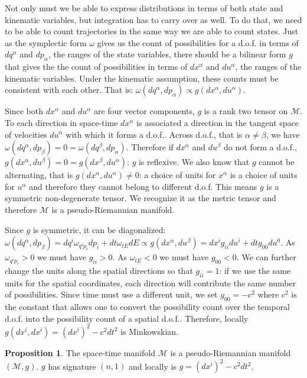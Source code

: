 \documentclass[smallextended]{svjour3}
\numberwithin{equation}{section}
\theoremstyle{definition}
\newtheorem{prop}[equation]{Proposition}
\begin{document}
Not only must we be able to express distributions in terms of both state and kinematic variables, but integration has to carry over as well. To do that, we need to be able to count trajectories in the same way we are able to count states. Just as the symplectic form $\omega$ gives us the count of possibilities for a d.o.f. in terms of $dq^\alpha$ and $dp_\alpha$, the ranges of the state variables, there should be a bilinear form $g$ that gives the the count of possibilities in terms of $dx^\alpha$ and $du^\alpha$, the ranges of the kinematic variables. Under the kinematic assumption, these counts must be consistent with each other. That is: $\omega(dq^\alpha,dp_\alpha) \propto g(dx^\alpha,du^\alpha)$.

Since both $dx^\alpha$ and $du^\alpha$ are four vector components, $g$ is a rank two tensor on $\mathcal{M}$. To each direction in space-time $dx^\alpha$ is associated a direction in the tangent space of velocities $du^\alpha$ with which it forms a d.o.f.. Across d.o.f., that is $\alpha \neq \beta$, we have $\omega(dq^\alpha, dp_\beta) = 0 =\omega(dq^\beta, dp_\alpha)$. Therefore if $dx^\alpha$ and $du^\beta$ do not form a d.o.f., $g(dx^\alpha, du^\beta) = 0 = g(dx^\beta, du^\alpha)$: $g$ is reflexive. We also know that $g$ cannot be alternating, that is $g(dx^\alpha, du^\alpha) \neq 0$: a choice of units for $x^\alpha$ is a choice of units for $u^\alpha$ and therefore they cannot belong to different d.o.f. This means $g$ is a symmetric non-degenerate tensor. We recognize it as the metric tensor and therefore $\mathcal{M}$ is a pseudo-Riemannian manifold.

Since $g$ is symmetric, it can be diagonalized: $\omega(dq^\alpha, dp_\beta)= dq^i \omega_{q^ip_i} dp_i + dt \omega_{tE} dE \propto g(dx^\alpha, du^\beta) = dx^i g_{ii} du^i + dt g_{00} du^0$. As $\omega_{q^ip_i} > 0$ we must have $g_{ii} > 0$. As $\omega_{tE} < 0$ we must have $g_{00} < 0$. We can further change the units along the spatial directions so that $g_{ii}=1$: if we use the same units for the spatial coordinates, each direction will contribute the same number of possibilities. Since time must use a different unit, we set $g_{00}=-c^2$ where $c^2$ is the constant that allows one to convert the possibility count over the temporal d.o.f. into the possibility count of a spatial d.o.f.. Therefore, locally $g(dx^i, dx^i) = (dx^i)^2 - c^2 dt^2$ is Minkowskian.

\begin{prop}\label{prop:riemannian_manifold}
	The space-time manifold $\mathcal{M}$ is a pseudo-Riemannian manifold $(\mathcal{M}, g)$. $g$ has signature $(n,1)$ and locally is $g = (dx^i)^2 - c^2 dt^2$.
\end{prop}
\end{document}

